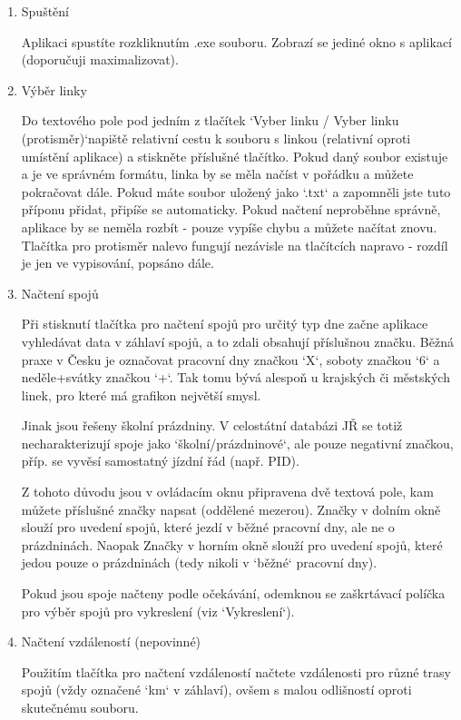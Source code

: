 \documentclass[14pt]{article}
\begin{document}
\begin{enumerate}
\item Spuštění 

Aplikaci spustíte rozkliknutím .exe souboru. Zobrazí se jediné okno s aplikací (doporučuji maximalizovat).

\item Výběr linky

Do textového pole pod jedním z tlačítek `Vyber linku / Vyber linku (protisměr)`napiště relativní cestu k souboru s linkou (relativní oproti umístění aplikace) a stiskněte příslušné tlačítko. 
Pokud daný soubor existuje a je ve správném formátu, linka by se měla načíst v pořádku a můžete pokračovat dále. Pokud máte soubor uložený jako `.txt` a zapomněli jste tuto příponu přidat, připíše se automaticky.
Pokud načtení neproběhne správně, aplikace by se neměla rozbít - pouze vypíše chybu a můžete načítat znovu.
Tlačítka pro protisměr nalevo fungují nezávisle na tlačítcích napravo - rozdíl je jen ve vypisování, popsáno dále.

\item Načtení spojů

Při stisknutí tlačítka pro načtení spojů pro určitý typ dne začne aplikace vyhledávat data v záhlaví spojů, a to zdali obsahují příslušnou značku. 
Běžná praxe v Česku je označovat pracovní dny značkou `X`, soboty značkou `6` a neděle+svátky značkou `+`. 
Tak tomu bývá alespoň u krajských či městských linek, pro které má grafikon největší smysl.

Jinak jsou řešeny školní prázdniny. V celostátní databázi JŘ se totiž necharakterizují spoje jako `školní/prázdninové`, ale pouze negativní značkou, příp. se vyvěsí samostatný jízdní řád (např. PID).

Z tohoto důvodu jsou v ovládacím oknu připravena dvě textová pole, kam můžete příslušné značky napsat (oddělené mezerou). Značky v dolním okně slouží pro uvedení spojů, které jezdí v běžné pracovní dny, ale ne o prázdninách.
Naopak Značky v horním okně slouží pro uvedení spojů, které jedou pouze o prázdninách (tedy nikoli v `běžné` pracovní dny).

Pokud jsou spoje načteny podle očekávání, odemknou se zaškrtávací políčka pro výběr spojů pro vykreslení (viz `Vykreslení`).

\item Načtení vzdáleností (nepovinné)

Použitím tlačítka pro načtení vzdáleností načtete vzdálenosti pro různé trasy spojů (vždy označené `km` v záhlaví), ovšem s malou odlišností oproti skutečnému souboru.


\end{enumerate}
\end{document}
